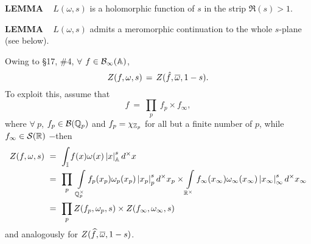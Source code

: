 \vspace{0.1cm}

\begin{x}{\small\bf LEMMA} \ %
$L(\omega,s)$ is a holomorphic function of $s$ in the strip $\Re(s) > 1.$
\end{x}

\vspace{0.1cm}

\begin{x}{\small\bf LEMMA} \ %
$L(\omega,s)$ admits a meromorphic continuation to the whole $s$-plane (see below).
\end{x}

\vspace{0.1cm}

\allowdisplaybreaks

Owing to \S17, \#4, $\forall$ $f \in \mathcal{B}_\infty(\mathbb{A})$, 
\allowdisplaybreaks
\[
Z(f,\omega,s) \hspace{0.05cm} = \hspace{0.05cm} Z(\hat{f},\overline{\omega},1-s).
\]
To exploit this, assume that 
\[
f \ = \ \prod_p \ f_p \times f_\infty,
\]
where $\forall \ p$, $f_p \in \mathcal{B}(\mathbb{Q}_p)$ and $f_p = \chi_{\mathbb{Z}_p}$ for all but a finite number of $p$, while 
$f_\infty \in \mathcal{S}(\mathbb{R})$ $-$then 
\begin{align*}
Z(f,\omega,s) \ 
&= \ \int_\I f(x) \omega(x) \abs{x}_\A^s d^\times x\\
&= \ \prod_p \ \int\limits_{\Q_p^\times} f_p(x_p) \omega_p(x_p) \abs{x_p}_p^s d^\times x_p 
\times 
\int\limits_{\R^\times} f_\infty(x_\infty)\omega_\infty(x_\infty) \abs{x_\infty}_\infty^s d^\times x_\infty\\
&= \ \prod_p Z(f_p,\omega_p,s) \times Z(f_\infty,\omega_\infty,s)
\end{align*}
and analogously for $Z(\widehat{f},\overline{\omega}, 1 - s)$.

\vspace{0.1cm}


